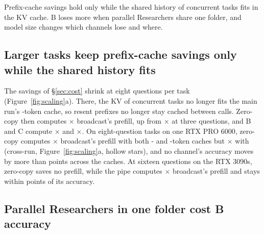 \documentclass[sigplan,10pt,nonacm,review,anonymous]{acmart}
\begin{document}
Prefix-cache savings hold only while the shared history of concurrent tasks fits in the KV cache. B loses
more when parallel Researchers share one folder, and model size changes which channels lose and where.

\subsection{Larger tasks keep prefix-cache savings only while the shared history fits}
\label{sec:larger}

The savings of \S\ref{sec:cost} shrink at eight questions per task (Figure~\ref{fig:scaling}a). There, the KV
of \nConcWord concurrent tasks no longer fits the main run's
\nBigKv-token cache, so resent prefixes no longer stay cached between calls. Zero-copy then computes
\nCompAZcKEight{}$\times$ broadcast's prefill, up from \nCompAZcKThree{}$\times$ at three questions, and B
and C compute \nCompBKEight{}$\times$ and \nCompCKEight{}$\times$. On \nPKvThirtyFiveN eight-question tasks on
one RTX PRO 6000, zero-copy computes \nPKvHundredCompAZc{}$\times$ broadcast's prefill with both \nKvPro- and
\nKvProHi-token caches but \nPKvThirtyFiveCompAZc{}$\times$ with \nKvProSmall (cross-run, Figure~\ref{fig:scaling}a, hollow stars), and no channel's
accuracy moves by more than \nPKvAccShiftMax points across the caches. At sixteen questions on the RTX 3090s,
zero-copy saves no prefill, while the pipe computes \nCompATwoKSixteen{}$\times$ broadcast's prefill and
stays within \nGapATwoKSixteen points of its accuracy.

\subsection{Parallel Researchers in one folder cost B accuracy}
\label{sec:writers}
\end{document}
